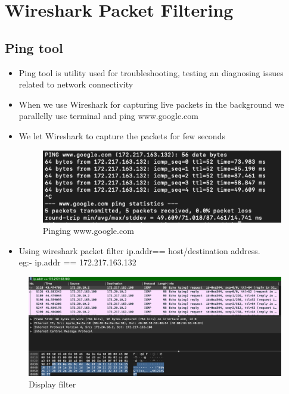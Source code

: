 \label{Wireshark Packet Filtering}
\chapter{Wireshark Packet Filtering}
\section{Ping tool}
\begin{itemize}
\item Ping tool is utility used for troubleshooting, testing an diagnosing issues related to network connectivity 
\item When we use Wireshark for capturing live packets in the background we parallelly use terminal and ping www.google.com 
\item We let Wireshark to capture the packets for few seconds 
\begin{figure}[H]
\centering
  \includegraphics[width=400pt]{Images/image ping.png}
  \caption{Pinging www.google.com}
  \label{fig:2.1}
\end{figure}
\item Using wireshark packet filter ip.addr== host/destination address.
\\eg:- ip.addr == 172.217.163.132
\end{itemize}
\begin{figure}[H]
\centering
  \includegraphics[width=400pt]{Images/DF ping .png}
  \caption{Display filter }
  \label{fig:2.2}
\end{figure}
